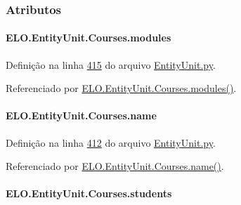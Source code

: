 \subsubsection{Atributos}
\hypertarget{classELO_1_1EntityUnit_1_1Courses_a14bdc53eeb2a7fde8e926cbab6e5206f}{
\paragraph[{modules}]{\setlength{\rightskip}{0pt plus 5cm}E\-L\-O.\-Entity\-Unit.\-Courses.\-modules}}\label{classELO_1_1EntityUnit_1_1Courses_a14bdc53eeb2a7fde8e926cbab6e5206f}


Definição na linha \hyperlink{EntityUnit_8py_source_l00415}{415} do arquivo \hyperlink{EntityUnit_8py_source}{Entity\-Unit.\-py}.



Referenciado por \hyperlink{classELO_1_1EntityUnit_1_1Courses_a5d791876c321c20f5a698273613d0d01}{E\-L\-O.\-Entity\-Unit.\-Courses.\-modules()}.

\hypertarget{classELO_1_1EntityUnit_1_1Courses_aeb94f54ad74895834eb7627dd38e1c8e}{
\paragraph[{name}]{\setlength{\rightskip}{0pt plus 5cm}E\-L\-O.\-Entity\-Unit.\-Courses.\-name}}\label{classELO_1_1EntityUnit_1_1Courses_aeb94f54ad74895834eb7627dd38e1c8e}


Definição na linha \hyperlink{EntityUnit_8py_source_l00412}{412} do arquivo \hyperlink{EntityUnit_8py_source}{Entity\-Unit.\-py}.



Referenciado por \hyperlink{classELO_1_1EntityUnit_1_1Courses_a7b502c0d94108e3c474e5a0e2842cc1d}{E\-L\-O.\-Entity\-Unit.\-Courses.\-name()}.

\hypertarget{classELO_1_1EntityUnit_1_1Courses_ac8e5e595ec895e03b088764d7506e735}{
\paragraph[{students}]{\setlength{\rightskip}{0pt plus 5cm}E\-L\-O.\-Entity\-Unit.\-Courses.\-students}}\label{classELO_1_1EntityUnit_1_1Courses_ac8e5e595ec895e03b088764d7506e735}


